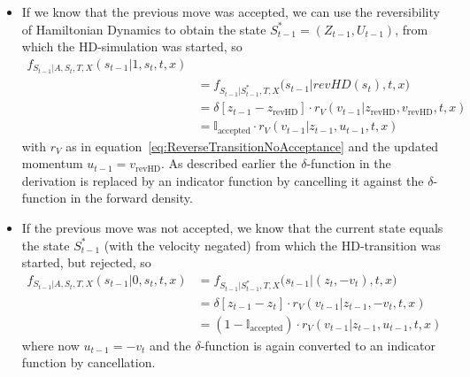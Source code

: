 \documentclass[12pt]{scrartcl}
\begin{document}
\begin{itemize}
\item If we know that the previous move was accepted, we can use the reversibility of Hamiltonian Dynamics to obtain the state $S_{t-1}^* = (Z_{t-1}, U_{t-1})$, from which the HD-simulation was started, so
\begin{equation}
\begin{split}
f_{S_{t-1} |A, S_t, T, X}(s_{t-1} | 1, s_t, t, x) \\
&= f_{S_{t-1} |S_{t-1}^*, T, X}\big(s_{t-1} | revHD(s_t), t, x\big) \\
&= \delta \left[z_{t-1} - z_{\textrm{revHD}} \right] \cdot r_V(v_{t-1}|z_{\textrm{revHD}}, v_{\textrm{revHD}}, t, x) \\
&= \mathbb{I}_\textrm{accepted} \cdot r_V(v_{t-1}|z_{t-1}, u_{t-1}, t, x) 
\end{split}
\end{equation}
with $r_V$ as in equation~\eqref{eq:ReverseTransitionNoAcceptance} and the updated momentum $u_{t-1} = v_{\textrm{revHD}}$. As described earlier the $\delta$-function in the derivation is replaced by an indicator function by cancelling it against the $\delta$-function in the forward density.
\item If the previous move was not accepted, we know that the current state equals the state $S_{t-1}^*$ (with the velocity negated) from which the HD-transition was started, but rejected, so
\begin{equation}
\begin{split}
f_{S_{t-1} |A, S_t, T, X}(s_{t-1} | 0, s_t, t, x) &= f_{S_{t-1} |S_{t-1}^*, T, X}\big(s_{t-1} | (z_t, -v_t), t, x\big) \\
&= \delta \left[z_{t-1} - z_{t} \right] \cdot r_V(v_{t-1}|z_{t-1}, -v_t, t, x) \\
&= (1 - \mathbb{I}_\textrm{accepted}) \cdot r_V(v_{t-1}| z_{t-1}, u_{t-1}, t, x)
\end{split}
\end{equation}
where now $u_{t-1} = -v_t$ and the $\delta$-function is again converted to an indicator function by cancellation.


\end{itemize}
\end{document}
